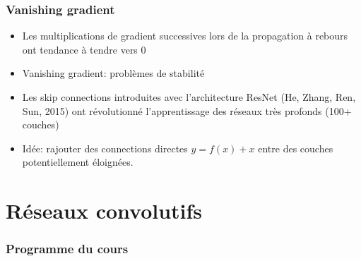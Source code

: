 \documentclass[9pt,table]{beamer} %
\begin{document}
\begin{frame}
\frametitle{Vanishing gradient}

\begin{itemize}[label=\tiny$\blacksquare$]
	\item Les multiplications de gradient successives lors de la propagation à rebours ont tendance à tendre vers 0
	\vfill
	\item \alert{Vanishing gradient}: problèmes de stabilité
	\vfill
	\item Les \alert{skip connections} introduites avec l'architecture ResNet (He, Zhang, Ren, Sun, 2015) ont révolutionné l'apprentissage des réseaux très profonds (100+ couches)
	\vfill
	\item Idée: rajouter des connections directes $y = f(x) + x$ entre des couches potentiellement éloignées. 
\end{itemize}

\end{frame}



\section{Réseaux convolutifs}
\begin{frame}
\frametitle{Programme du cours}
\tableofcontents[currentsection]
\end{frame}
\end{document}
